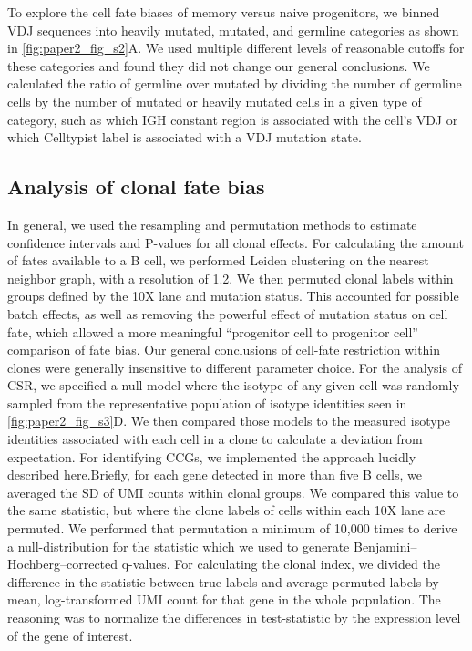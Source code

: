 To explore the cell fate biases of memory versus naive progenitors, we binned VDJ sequences into heavily mutated, mutated, and germline categories as shown in \ref{fig:paper2_fig_s2}A. We used multiple different levels of reasonable cutoffs for these categories and found they did not change our general conclusions. We calculated the ratio of germline over mutated by dividing the number of germline cells by the number of mutated or heavily mutated cells in a given type of category, such as which IGH constant region is associated with the cell’s VDJ or which Celltypist label is associated with a VDJ mutation state.
\subsection{Analysis of clonal fate bias}

In general, we used the resampling and permutation methods to estimate confidence intervals and P-values for all clonal effects. For calculating the amount of fates available to a B cell, we performed Leiden clustering on the nearest neighbor graph, with a resolution of 1.2. We then permuted clonal labels within groups defined by the 10X lane and mutation status. This accounted for possible batch effects, as well as removing the powerful effect of mutation status on cell fate, which allowed a more meaningful “progenitor cell to progenitor cell” comparison of fate bias. Our general conclusions of cell-fate restriction within clones were generally insensitive to different parameter choice. For the analysis of CSR, we specified a null model where the isotype of any given cell was randomly sampled from the representative population of isotype identities seen in \ref{fig:paper2_fig_s3}D. We then compared those models to the measured isotype identities associated with each cell in a clone to calculate a deviation from expectation. For identifying CCGs, we implemented the approach lucidly described here\cite{horton_multiplexed_2018}.Briefly, for each gene detected in more than five B cells, we averaged the SD of UMI counts within clonal groups. We compared this value to the same statistic, but where the clone labels of cells within each 10X lane are permuted. We performed that permutation a minimum of 10,000 times to derive a null-distribution for the statistic which we used to generate Benjamini–Hochberg–corrected q-values. For calculating the clonal index, we divided the difference in the statistic between true labels and average permuted labels by mean, log-transformed UMI count for that gene in the whole population. The reasoning was to normalize the differences in test-statistic by the expression level of the gene of interest.
